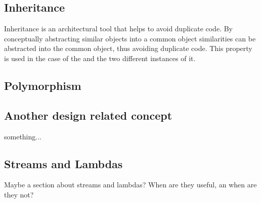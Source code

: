 \subsection{Inheritance} 
Inheritance is an architectural tool that helps to avoid duplicate code. By conceptually abstracting similar objects into a common object similarities can be abstracted into the common object, thus avoiding duplicate code. This property is used in the case of the  and the two different instances of it.

\subsection{Polymorphism} 

\subsection{Another design related concept}
something...
 
\subsection{Streams and Lambdas}
Maybe a section about streams and lambdas? When are they useful, an when are they not?


 
